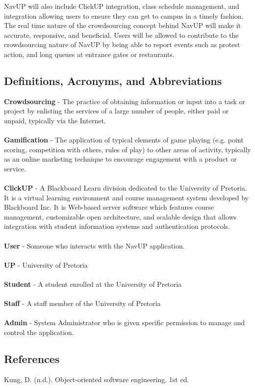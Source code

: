 \documentclass[12pt]{article}
\begin{document}
 NavUP will also include ClickUP integration, class schedule management, and integration allowing users to ensure they can get to campus in a timely fashion. 
The real time nature of the crowdsourcing concept behind NavUP will make it accurate, responsive, and beneficial.
Users will be allowed to contribute to the crowdsourcing nature of NavUP by being able to report events such as protest action, and long queues at entrance gates or restaurants.

	\subsection{Definitions, Acronyms, and Abbreviations}
		{\bfseries Crowdsourcing} - The practice of obtaining information or input into a task or project by enlisting the services of a large number of people, either paid or unpaid, typically via the Internet.\\\\
		{\bfseries Gamification} - The application of typical elements of game playing (e.g. point scoring, competition with others, rules of play) to other areas of activity, typically as an online marketing technique to encourage engagement with a product or service.\\\\
		{\bfseries ClickUP} - A Blackboard Learn division dedicated to the University of Pretoria. It is a virtual learning environment and course management system developed by Blackboard Inc. It is Web-based server software which features course management, customizable open architecture, and scalable design that allows integration with student information systems and authentication protocols.\\\\
		{\bfseries User} - Someone who interacts with the NavUP application.\\\\
		{\bfseries UP} - University of Pretoria\\\\
		{\bfseries Student} - A student enrolled at the University of Pretoria\\\\		
		{\bfseries Staff} - A staff member of the University of Pretoria\\\\	
		{\bfseries Admin} - System Administrator who is given specific permission to manage and control the application.

		
	\subsection{References}
		Kung, D. (n.d.). Object-oriented software engineering. 1st ed.
		
\end{document}
